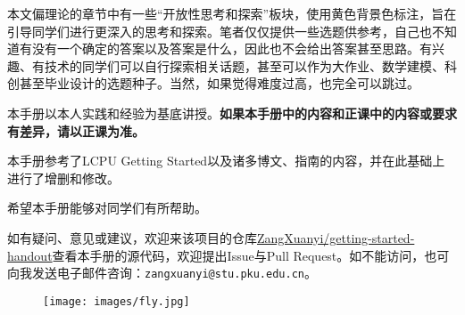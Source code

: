 \documentclass[../main.tex]{subfiles}
\begin{document}
本文偏理论的章节中有一些“开放性思考和探索”板块，使用黄色背景色标注，旨在引导同学们进行更深入的思考和探索。笔者仅仅提供一些选题供参考，自己也不知道有没有一个确定的答案以及答案是什么，因此也不会给出答案甚至思路。有兴趣、有技术的同学们可以自行探索相关话题，甚至可以作为大作业、数学建模、科创甚至毕业设计的选题种子。当然，如果觉得难度过高，也完全可以跳过。

本手册以本人实践和经验为基底讲授。\textbf{如果本手册中的内容和正课中的内容或要求有差异，请以正课为准。}

本手册参考了LCPU Getting Started以及诸多博文、指南的内容，并在此基础上进行了增删和修改。

希望本手册能够对同学们有所帮助。

如有疑问、意见或建议，欢迎来该项目的仓库\faGithub\href{https://github.com/ZangXuanyi/getting-started-handout}{ZangXuanyi/getting-started-handout}查看本手册的源代码，欢迎提出Issue与Pull Request。如不能访问，也可向我发送电子邮件咨询：\texttt{zangxuanyi@stu.pku.edu.cn}。

\begin{figure}[ht]
  \centering
  \texttt{[image: images/fly.jpg]}
\end{figure}
\end{document}
